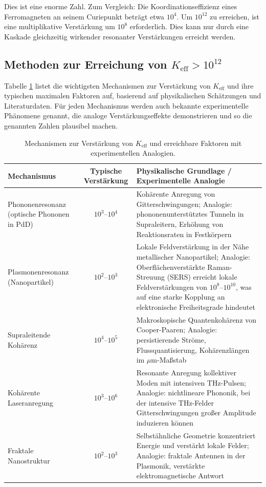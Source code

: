\documentclass[12pt]{article}
\theoremstyle{remark}
\newcommand{\Keff}{K_{\mathrm{eff}}}
\begin{document}
	Dies ist eine enorme Zahl. Zum Vergleich: Die Koordinationseffizienz eines Ferromagneten an seinem Curiepunkt beträgt etwa \(10^4\). Um \(10^{12}\) zu erreichen, ist eine multiplikative Verstärkung um \(10^8\) erforderlich. Dies kann nur durch eine Kaskade gleichzeitig wirkender resonanter Verstärkungen erreicht werden.
	
	\subsection{Methoden zur Erreichung von \(\Keff > 10^{12}\)}
	
	Tabelle \ref{tab:enhancement} listet die wichtigsten Mechanismen zur Verstärkung von \(\Keff\) und ihre typischen maximalen Faktoren auf, basierend auf physikalischen Schätzungen und Literaturdaten. Für jeden Mechanismus werden auch bekannte experimentelle Phänomene genannt, die analoge Verstärkungseffekte demonstrieren und so die genannten Zahlen plausibel machen.
	
	\begin{table}[htbp]
		\centering
		\caption{Mechanismen zur Verstärkung von \(\Keff\) und erreichbare Faktoren mit experimentellen Analogien.}
		\label{tab:enhancement}
		\small
		\begin{tabularx}{\textwidth}{>{\raggedright\arraybackslash}p{3.2cm} c X}
			\toprule
			\textbf{Mechanismus} & \textbf{Typische Verstärkung} & \textbf{Physikalische Grundlage / Experimentelle Analogie} \\
			\midrule
			Phononenresonanz (optische Phononen in PdD) & \(10^3\)–\(10^4\) & Kohärente Anregung von Gitterschwingungen; Analogie: phononenunterstütztes Tunneln in Supraleitern, Erhöhung von Reaktionsraten in Festkörpern \cite{Storms2014, Tinkham2004} \\
			Plasmonenresonanz (Nanopartikel) & \(10^2\)–\(10^3\) & Lokale Feldverstärkung in der Nähe metallischer Nanopartikel; Analogie: Oberflächenverstärkte Raman-Streuung (SERS) erreicht lokale Feldverstärkungen von \(10^8\)–\(10^{10}\), was auf eine starke Kopplung an elektronische Freiheitsgrade hindeutet \cite{Maier2007, SERS} \\
			Supraleitende Kohärenz & \(10^4\)–\(10^5\) & Makroskopische Quantenkohärenz von Cooper-Paaren; Analogie: persistierende Ströme, Flussquantisierung, Kohärenzlängen im \(\mu\)m-Maßstab \cite{Tinkham2004} \\
			Kohärente Laseranregung & \(10^3\)–\(10^6\) & Resonante Anregung kollektiver Moden mit intensiven THz-Pulsen; Analogie: nichtlineare Phononik, bei der intensive THz-Felder Gitterschwingungen großer Amplitude induzieren können \cite{Kampfrath2011} \\
			Fraktale Nanostruktur & \(10^2\)–\(10^3\) & Selbstähnliche Geometrie konzentriert Energie und verstärkt lokale Felder; Analogie: fraktale Antennen in der Plasmonik, verstärkte elektromagnetische Antwort \cite{Mandelbrot1982, fractal-antenna} \\
			\bottomrule
		\end{tabularx}
	\end{table}
	
\end{document}
